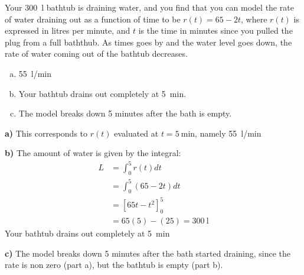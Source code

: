\question Your \SI{300}{\litre} bathtub is draining water, and you find that you can model the rate of water draining out as a function of time to be $r(t)=65-2t$, where $r(t)$ is expressed in litres per minute, and $t$ is the time in minutes since you pulled the plug from a full baththub. As times goes by and the water level goes down, the rate of water coming out of the bathtub decreases.
\begin{finalanswer}
\begin{enumerate}[(a)]
\item \SI{55}{\litre/\minute}
\item Your bathtub drains out completely at \SI{5}{\minute}.
\item The model breaks down 5 minutes after the bath is empty.
\end{enumerate}
\end{finalanswer}
\begin{solution}
\textbf{a)} This corresponds to $r(t)$ evaluated at $t=\SI{5}{\minute}$, namely \SI{55}{\litre/\minute}


\textbf{b)} The amount of water is given by the integral:
\begin{align*}
L &= \int_0^{5}r(t)dt \\
&=\int_0^{5}(65-2t)dt\\
&=[65t-t^2]_0^{5}\\
&=65(5)-(25)= \SI{300}{\litre}
\end{align*}
Your bathtub drains out completely at \SI{5}{\minute}

\textbf{c)} The model breaks down 5 minutes after the bath started draining, since the rate is non zero (part a), but the bathtub is empty (part b).

\end{solution}


